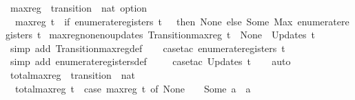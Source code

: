 \begin{isabellebody}
%
\endisadelimproof
\isanewline
{}\isamarkupfalse%
\ max{\isacharunderscore}reg\ {\isacharcolon}{\isacharcolon}\ {\isachardoublequoteopen}transition\ {\isasymRightarrow}\ nat\ option{\isachardoublequoteclose}\ \isanewline
\ \ {\isachardoublequoteopen}max{\isacharunderscore}reg\ t\ {\isacharequal}\ {\isacharparenleft}if\ enumerate{\isacharunderscore}registers\ t\ {\isacharequal}\ {\isacharbraceleft}{\isacharbraceright}\ then\ None\ else\ Some\ {\isacharparenleft}Max\ {\isacharparenleft}enumerate{\isacharunderscore}registers\ t{\isacharparenright}{\isacharparenright}{\isacharparenright}{\isachardoublequoteclose}\isanewline
\isanewline
{}\isamarkupfalse%
\ max{\isacharunderscore}reg{\isacharunderscore}none{\isacharunderscore}no{\isacharunderscore}updates{\isacharcolon}\ {\isachardoublequoteopen}Transition{\isachardot}max{\isacharunderscore}reg\ t\ {\isacharequal}\ None\ {\isasymLongrightarrow}\ Updates\ t\ {\isacharequal}\ {\isacharbrackleft}{\isacharbrackright}{\isachardoublequoteclose}\isanewline
%
\isadelimproof
\ \ %
\endisadelimproof
%
\isatagproof
{}\isamarkupfalse%
\ {\isacharparenleft}simp\ add{\isacharcolon}\ Transition{\isachardot}max{\isacharunderscore}reg{\isacharunderscore}def{\isacharparenright}\isanewline
\ \ \isamarkupfalse%
\ {\isacharparenleft}case{\isacharunderscore}tac\ {\isachardoublequoteopen}enumerate{\isacharunderscore}registers\ t\ {\isacharequal}\ {\isacharbraceleft}{\isacharbraceright}{\isachardoublequoteclose}{\isacharparenright}\isanewline
\ \ \ \isamarkupfalse%
\ {\isacharparenleft}simp\ add{\isacharcolon}\ enumerate{\isacharunderscore}registers{\isacharunderscore}def{\isacharparenright}\isanewline
\ \ \ \isamarkupfalse%
\ {\isacharparenleft}case{\isacharunderscore}tac\ {\isachardoublequoteopen}Updates\ t{\isachardoublequoteclose}{\isacharparenright}\isanewline
\ \ \isamarkupfalse%
\ auto%
\endisatagproof
{\isafoldproof}%
%
\isadelimproof
\isanewline
%
\endisadelimproof
\isanewline
{}\isamarkupfalse%
\ total{\isacharunderscore}max{\isacharunderscore}reg\ {\isacharcolon}{\isacharcolon}\ {\isachardoublequoteopen}transition\ {\isasymRightarrow}\ nat{\isachardoublequoteclose}\ \isanewline
\ \ {\isachardoublequoteopen}total{\isacharunderscore}max{\isacharunderscore}reg\ t\ {\isacharequal}\ {\isacharparenleft}case\ max{\isacharunderscore}reg\ t\ of\ None\ {\isasymRightarrow}\ {}\ {\isacharbar}\ Some\ a\ {\isasymRightarrow}\ a{\isacharparenright}{\isachardoublequoteclose}\isanewline

\end{isabellebody}
